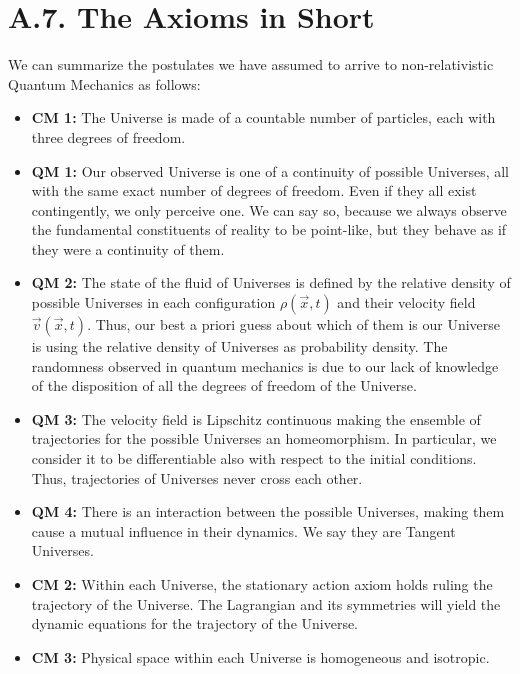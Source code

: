 \documentclass[11pt, a4paper]{article} %
\begin{document}
\section*{A.7. The Axioms in Short}
We can summarize the postulates we have assumed to arrive to non-relativistic Quantum Mechanics as follows:
\begin{itemize}
\item {\bf CM 1:} The Universe is made of a countable number of particles, each with three degrees of freedom.

\item {\bf QM 1:} Our observed Universe is one of a continuity of possible Universes, all with the same exact number of degrees of freedom. Even if they all exist contingently, we only perceive one. We can say so, because we always observe the fundamental constituents of reality to be point-like, but they behave as if they were a continuity of them.

\item {\bf QM 2:} The state of the fluid of Universes is defined by the relative density of possible Universes in each configuration $\rho(\vec{x},t)$ and their velocity field $\vec{v}(\vec{x},t)$. Thus, our best a priori guess about which of them is our Universe is using the relative density of Universes as probability density. The randomness observed in quantum mechanics is due to our lack of knowledge of the disposition of all the degrees of freedom of the Universe.

\item {\bf QM 3:} The velocity field is Lipschitz continuous making the ensemble of trajectories for the possible Universes an homeomorphism. In particular, we consider it to be differentiable also with respect to the initial conditions. Thus, trajectories of Universes never cross each other.

\item {\bf QM 4:} There is an interaction between the possible Universes, making them cause a mutual influence in their dynamics. We say they are Tangent Universes.

\item {\bf CM 2:} Within each Universe, the stationary action axiom holds ruling the trajectory of the Universe. The Lagrangian and its symmetries will yield the dynamic equations for the trajectory of the Universe.

\item {\bf CM 3:} Physical space within each Universe is homogeneous and isotropic.


\end{itemize}
\end{document}
